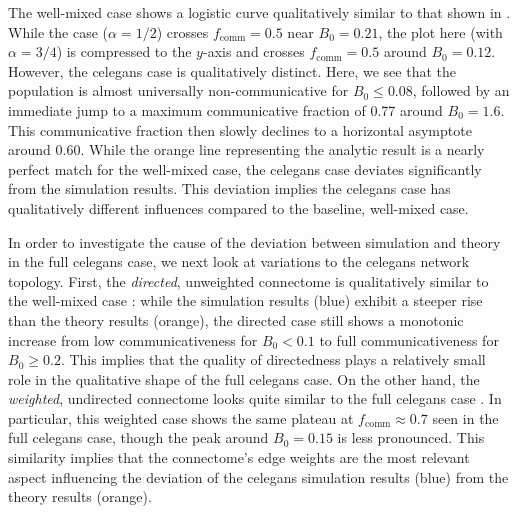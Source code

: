 \documentclass[pdflatex,lineno,referee,sn-mathphys-ay]{sn-jnl}
\begin{document}
The  well-mixed case shows a logistic curve
qualitatively similar to that shown in \citet{tripp2022evolutionary}.
While the \citet{tripp2022evolutionary} case ($\alpha = 1/2$)
crosses $f_{\text{comm}} = 0.5$ near $B_0 = 0.21$,
the plot here (with $\alpha = 3/4$) is compressed to the $y$-axis
and crosses $f_{\text{comm}} = 0.5$ around $B_0 = 0.12$.
However, the  \gls{celegans} case
is qualitatively distinct.
Here, we see that the population is almost universally non-communicative
for $B_0 \le 0.08$,
followed by an immediate jump to a maximum communicative fraction
of \num{0.77} around $B_0 = 1.6$.
This communicative fraction then slowly declines
to a horizontal asymptote around \num{0.60}.
While the orange line representing the analytic result
is a nearly perfect match for the  well-mixed case,
the  \gls{celegans} case deviates significantly
from the simulation results.
This deviation implies the \gls{celegans} case
has qualitatively different influences compared to the baseline, well-mixed case.

In order to investigate the cause of the deviation
between simulation and theory
in the  full \gls{celegans} case,
we next look at variations to the \gls{celegans} network topology.
First, the 
\emph{directed}, unweighted connectome
is qualitatively similar to the
well-mixed case :
while the simulation results (blue) exhibit a steeper rise
than the theory results (orange),
the directed case still shows a monotonic increase
from low communicativeness for $B_0 < 0.1$
to full communicativeness for $B_0 \ge 0.2$.
This implies that the quality of directedness
plays a relatively small role in the qualitative shape
of the  full \gls{celegans} case.
On the other hand,
the 
\emph{weighted}, undirected connectome
looks quite similar to the 
full \gls{celegans} case .
In particular, this 
weighted case
shows the same plateau at $f_{\text{comm}} \approx 0.7$
seen in the  full \gls{celegans} case,
though the peak around $B_0 = 0.15$ is less pronounced.
This similarity implies that the connectome's edge weights
are the most relevant aspect influencing the deviation
of the  \gls{celegans}
simulation results (blue) from the theory results (orange).
\end{document}
